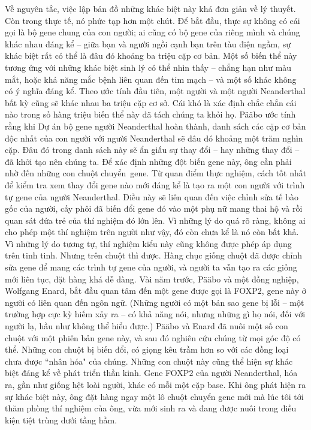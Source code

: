 \begin{multicols}{2}
	Về nguyên tắc, việc lập bản đồ những khác biệt này khá đơn giản về lý thuyết. Còn trong thực tế, nó phức tạp hơn một chút. Để bắt đầu, thực sự không có cái gọi là bộ gene chung của con người; ai cũng có bộ gene của riêng mình và chúng khác nhau đáng kể -- giữa bạn và người ngồi cạnh bạn trên tàu điện ngầm, sự khác biệt rất có thể là đâu đó khoảng ba triệu cặp cơ bản. Một số biến thể này tương ứng với những khác biệt sinh lý có thể nhìn thấy -- chẳng hạn như màu mắt, hoặc khả năng mắc bệnh liên quan đến tim mạch -- và một số khác không có ý nghĩa đáng kể. Theo ước tính đầu tiên, một người và một người Neanderthal bất kỳ cũng sẽ khác nhau ba triệu cặp cơ sở. Cái khó là xác định chắc chắn cái nào trong số hàng triệu biến thể này đã tách chúng ta khỏi họ. Pääbo ước tính rằng khi Dự án bộ gene người Neanderthal hoàn thành, danh sách các cặp cơ bản độc nhất của con người với người Neanderthal sẽ đâu đó khoảng một trăm nghìn cặp. Đâu đó trong danh sách này sẽ ẩn giấu sự thay đổi -- hay những thay đổi -- đã khởi tạo nên chúng ta. Để xác định những đột biến gene này, ông cần phải nhờ đến những con chuột chuyển~gene.
	\vskip 0.1cm
	Từ quan điểm thực nghiệm, cách tốt nhất để kiểm tra xem thay đổi gene nào mới đáng kể là tạo ra một con người với trình tự gene của người Neanderthal. Điều này sẽ liên quan đến việc chỉnh sửa tế bào gốc của người, cấy phôi đã biến đổi gene đó vào một phụ nữ mang thai hộ và rồi quan sát đứa trẻ của thí nghiệm đó lớn lên. Vì những lý do quá rõ ràng, không ai cho phép một thí nghiệm trên người như vậy, đó còn chưa kể là nó còn bất khả. Vì những lý do tương tự, thí nghiệm kiểu này cũng không được phép áp dụng trên tinh tinh. Nhưng trên chuột thì được. Hàng chục giống chuột đã được chỉnh sửa gene để mang các trình tự gene của người, và người ta vẫn tạo ra các giống mới liên tục, đặt hàng khá dễ dàng.
	\vskip 0.1cm
	Vài năm trước, Pääbo và một đồng nghiệp, Wolfgang Enard, bắt đầu quan tâm đến một gene được gọi là FOXP$2$, gene này ở người có liên quan đến ngôn ngữ. (Những người có một bản sao gene bị lỗi -- một trường hợp cực kỳ hiếm xảy ra -- có khả năng nói, nhưng những gì họ nói, đối với người lạ, hầu như không thể hiểu được.) Pääbo và Enard đã nuôi một số con chuột với một phiên bản gene này, và sau đó nghiên cứu chúng từ mọi góc độ có thể. Những con chuột bị biến đổi, có giọng kêu trầm hơn so với các đồng loại chưa được ``nhân hóa" của chúng. Những con chuột này cũng thể hiện sự khác biệt đáng kể về phát triển thần kinh. Gene FOXP$2$ của người Neanderthal, hóa ra, gần như giống hệt loài người, khác có mỗi một cặp base. Khi ông phát hiện ra sự khác biệt này, ông đặt hàng ngay một lô chuột chuyển gene mới mà lúc tôi tới thăm phòng thí nghiệm của ông, vừa mới sinh ra và đang được nuôi trong điều kiện tiệt trùng dưới tầng hầm.

\end{multicols}
